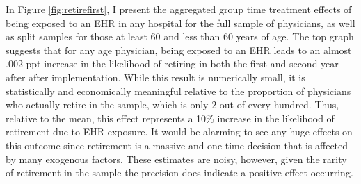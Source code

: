 \documentclass[11pt]{article}
\begin{document}
In Figure \ref{fig:retirefirst}, I present the aggregated group time treatment effects of being exposed to an EHR in any hospital for the full sample of physicians, as well as split samples for those at least 60 and less than 60 years of age. The top graph suggests that for any age physician, being exposed to an EHR leads to an almost .002 ppt increase in the likelihood of retiring in both the first and second year after after implementation. While this result is numerically small, it is statistically and economically meaningful relative to the proportion of physicians who actually retire in the sample, which is only 2 out of every hundred. Thus, relative to the mean, this effect represents a 10\% increase in the likelihood of retirement due to EHR exposure. It would be alarming to see any huge effects on this outcome since retirement is a massive and one-time decision that is affected by many exogenous factors. These estimates are noisy, however, given the rarity of retirement in the sample the precision does indicate a positive effect occurring.
\end{document}
